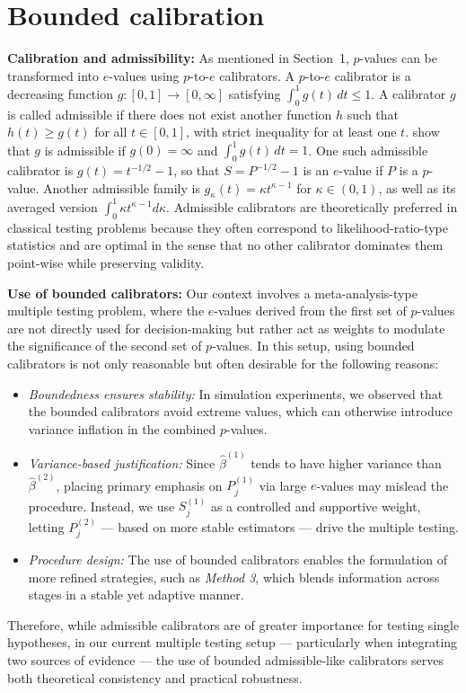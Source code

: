 \documentclass[11pt]{article}
\numberwithin{equation}{section}
\theoremstyle{plain}
\theoremstyle{remark}
\begin{document}
\section{Bounded calibration}

\textbf{Calibration and admissibility:} As mentioned in Section~1, \(p\)-values can be transformed into \(e\)-values using \(p\)-to-\(e\) calibrators. A \(p\)-to-\(e\) calibrator is a decreasing function \(g : [0,1] \to [0,\infty]\) satisfying \(\int_0^1 g(t)\,dt \leq 1\). A calibrator \(g\) is called admissible if there does not exist another function \(h\) such that \(h(t) \geq g(t)\) for all \(t \in [0,1]\), with strict inequality for at least one \(t\). \citet{vovk2021evalues} show that \(g\) is admissible if \(g(0) = \infty\) and \(\int_0^1 g(t)\,dt = 1\). One such admissible calibrator is \(g(t) = t^{-1/2} - 1\), so that \(S = P^{-1/2} - 1\) is an \(e\)-value if \(P\) is a \(p\)-value. Another admissible family is \(g_\kappa(t) = \kappa t^{\kappa - 1}\) for \(\kappa \in (0,1)\), as well as its averaged version \(\int_0^1 \kappa t^{\kappa - 1} d\kappa\). Admissible calibrators are theoretically preferred in classical testing problems because they often correspond to likelihood-ratio-type statistics and are optimal in the sense that no other calibrator dominates them point-wise while preserving validity.

\textbf{Use of bounded calibrators:} Our context involves a meta-analysis-type multiple testing problem, where the \(e\)-values derived from the first set of \(p\)-values are not directly used for decision-making but rather act as weights to modulate the significance of the second set of \(p\)-values. In this setup, using bounded calibrators is not only reasonable but often desirable for the following reasons:
\begin{itemize}
\item \textit{Boundedness ensures stability:} In simulation experiments, we observed that the bounded calibrators avoid extreme values, which can otherwise introduce variance inflation in the combined \(p\)-values.
\item \textit{Variance-based justification:} Since \(\hat{\beta}^{(1)}\) tends to have higher variance than \(\hat{\beta}^{(2)}\), placing primary emphasis on \(P_j^{(1)}\) via large \(e\)-values may mislead the procedure. Instead, we use \(S_j^{(1)}\) as a controlled and supportive weight, letting \(P_j^{(2)}\) — based on more stable estimators — drive the multiple testing.
\item \textit{Procedure design:} The use of bounded calibrators enables the formulation of more refined strategies, such as \textit{Method 3}, which blends information across stages in a stable yet adaptive manner.
\end{itemize}
Therefore, while admissible calibrators are of greater importance for testing single hypotheses, in our current multiple testing setup — particularly when integrating two sources of evidence — the use of bounded admissible-like calibrators serves both theoretical consistency and practical robustness. 
\end{document}
